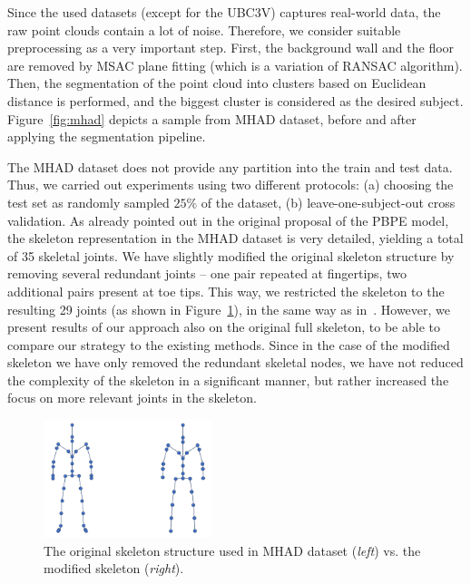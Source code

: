 \noindent
Since the used datasets (except for the UBC3V) captures real-world data, the raw point clouds contain a lot of noise. Therefore, we consider suitable preprocessing as a very important step. First, the background wall and the floor are removed by MSAC plane fitting (which is a variation of RANSAC algorithm). Then, the segmentation of the point cloud into clusters based on Euclidean distance is performed, and the biggest cluster is considered as the desired subject. Figure~\ref{fig:mhad} depicts a sample from MHAD dataset, before and after applying the segmentation pipeline.%
\par

\vspace{5mm}
\noindent
The MHAD dataset does not provide any partition into the train and test data. Thus, we carried out experiments using two different protocols: (a) choosing the test set as randomly sampled $25 \%$ of the dataset, (b) leave-one-subject-out cross validation. As already pointed out in the original proposal of the PBPE model, the skeleton representation in the MHAD dataset is very detailed, yielding a total of 35 skeletal joints. We have slightly modified the original skeleton structure by removing several redundant joints – one pair repeated at fingertips, two additional pairs present at toe tips. This way, we restricted the skeleton to the resulting 29 joints (as shown in Figure~\ref{fig:mhad_skeletons}), in the same way as in~\cite{Ali19}. However, we present results of our approach also on the original full skeleton, to be able to compare our strategy to the existing methods. Since in the case of the modified skeleton we have only removed the redundant skeletal nodes, we have not reduced the complexity of the skeleton in a significant manner, but rather increased the focus on more relevant joints in the skeleton.

\vspace{5mm}
\begin{figure}[H]
\begin{center}
  \includegraphics[height=130px]{images/implementation/mhad_skeletons.png}
  \caption[The skeleton structure used in MHAD dataset before and after modification.]{The original skeleton structure used in MHAD dataset ({\it left}) vs. the modified skeleton ({\it right}).}
  \label{fig:mhad_skeletons}
\end{center}
\end{figure}

